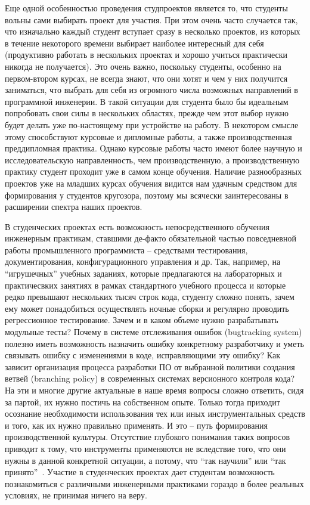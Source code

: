 \documentclass[a4paper]{article}
\begin{document}
Еще одной особенностью проведения студпроектов является то, что студенты вольны сами выбирать проект для участия. При этом очень часто случается так, что изначально каждый студент вступает сразу в несколько проектов, из которых в течение некоторого времени выбирает наиболее интересный для себя (продуктивно работать в нескольких проектах и хорошо учиться практически никогда не получается). Это очень важно, поскольку студенты, особенно на первом-втором курсах, не всегда знают, что они хотят и чем у них получится заниматься, что выбрать для себя из огромного числа возможных направлений в программной инженерии. В такой ситуации для студента было бы идеальным попробовать свои силы в нескольких областях, прежде чем этот выбор нужно будет делать уже по-настоящему при устройстве на работу. В некотором смысле этому способствуют курсовые и дипломные работы, а также производственная преддипломная практика. Однако курсовые работы часто имеют более научную и  исследовательскую направленность, чем производственную, а производственную практику студент проходит уже в самом конце обучения. Наличие разнообразных проектов уже на младших курсах обучения видится нам удачным средством для формирования у студентов кругозора, поэтому мы всячески заинтересованы в расширении спектра наших проектов. 

В студенческих проектах есть возможность непосредственного обучения инженерным практикам, ставшими де-факто обязательной частью повседневной работы промышленного программиста -- средствами тестирования, документирования, конфигурационного управления и др. Так, например, на ``игрушечных'' учебных заданиях, которые предлагаются на лабораторных и практичесвких занятиях в рамках стандартного учебного процесса и которые редко превышают нескольких тысяч строк кода, студенту сложно понять, зачем ему может понадобиться осуществлять ночные сборки и регулярно проводить регрессионное тестирование. Зачем и в каком объеме нужно разрабатывать модульные тесты? Почему в системе отслеживания ошибок (bugtracking system) полезно иметь возможность назначить ошибку конкретному разработчику и уметь связывать ошибку с изменениями в коде, исправляющими эту ошибку? Как зависит организация процесса разработки ПО от выбранной политики создания ветвей (branching policy) в современных системах версионного контроля кода? На эти и многие другие актуальные в наше время вопросы сложно ответить, сидя за партой, их нужно постичь на собственном опыте. Только тогда приходит осознание необходимости использования тех или иных инструментальных средств и того, как их нужно правильно применять. И это -- путь формирования производственной культуры. Отсутствие глубокого понимания таких вопросов приводит к тому, что инструменты применяются не вследствие того, что они нужны в данной конкретной ситуации, а потому, что ``так научили'' или ``так принято''~\cite{cargoCult}. Участие в студенческих проектах дает студентам возможность познакомиться с различными инженерными практиками гораздо в более реальных условиях, не принимая ничего на веру. 
\end{document}
